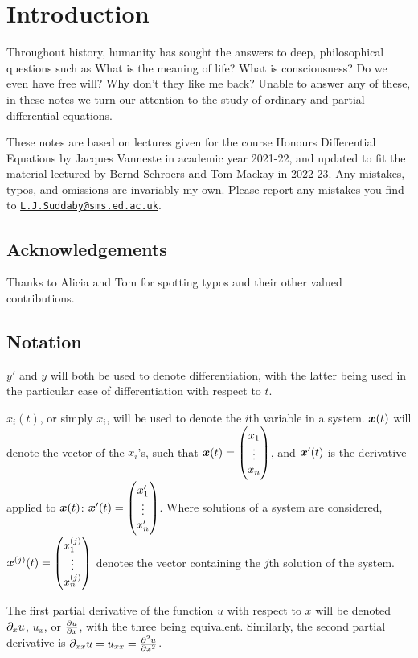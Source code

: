 \section*{Introduction}

Throughout history, humanity has sought the answers to deep, philosophical questions such as What is the meaning of life? What is consciousness? Do we even have free will? Why don't they like me back? Unable to answer any of these, in these notes we turn our attention to the study of ordinary and partial differential equations.

These notes are based on lectures given for the course Honours Differential Equations by Jacques Vanneste in academic year 2021-22, and updated to fit the material lectured by Bernd Schroers and Tom Mackay in 2022-23. Any mistakes, typos, and omissions are invariably my own. Please report any mistakes you find to \texttt{\href{mailto:L.J.Suddaby@sms.ed.ac.uk}{L.J.Suddaby@sms.ed.ac.uk}}.

\subsection*{Acknowledgements}

Thanks to Alicia and Tom for spotting typos and their other valued contributions.

\subsection*{Notation}

$y'$ and $\dot{y}$ will both be used to denote differentiation, with the latter being used in the particular case of differentiation with respect to $t$.

$x_i(t)$, or simply $x_i$, will be used to denote the $i$th variable in a system. $\bm{x}(t)$ will denote the vector of the $x_i$'s, such that $\bm{x}(t) = \begin{pmatrix}x_1 \\ \vdots \\ x_n\end{pmatrix}$, and $\bm{x}'(t)$ is the derivative applied to $\bm{x}(t)$: $\bm{x}'(t) = \begin{pmatrix}x_1' \\ \vdots \\ x_n'\end{pmatrix}$. Where solutions of a system are considered, $\bm{x}^{(j)}(t) = \begin{pmatrix}x_1^{(j)} \\ \vdots \\ x_n^{(j)}\end{pmatrix}$ denotes the vector containing the $j$th solution of the system.

The first partial derivative of the function $u$ with respect to $x$ will be denoted $\partial_x u$, $u_x$, or $\frac{\partial u}{\partial x}$, with the three being equivalent. Similarly, the second partial derivative is $\partial_{xx}u = u_{xx} = \frac{\partial^2 u}{\partial x^2}$.